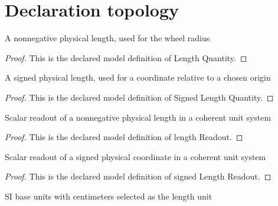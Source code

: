 \section{Declaration topology}
\begin{definition}
  \label{def:physics:phyx-mini-0736:phyxminiproblems-problemphyxmini0736-lengthquantity}
  A nonnegative physical length, used for the wheel radius
\end{definition}
\begin{proof}
  This is the declared model definition of Length Quantity.
\end{proof}
\begin{definition}
  \label{def:physics:phyx-mini-0736:phyxminiproblems-problemphyxmini0736-signedlengthquantity}
  A signed physical length, used for a coordinate relative to a chosen origin
\end{definition}
\begin{proof}
  This is the declared model definition of Signed Length Quantity.
\end{proof}
\begin{definition}
  \label{def:physics:phyx-mini-0736:phyxminiproblems-problemphyxmini0736-lengthreadout}
  Scalar readout of a nonnegative physical length in a coherent unit system
\end{definition}
\begin{proof}
  This is the declared model definition of length Readout.
\end{proof}
\begin{definition}
  \label{def:physics:phyx-mini-0736:phyxminiproblems-problemphyxmini0736-signedlengthreadout}
  Scalar readout of a signed physical coordinate in a coherent unit system
\end{definition}
\begin{proof}
  This is the declared model definition of signed Length Readout.
\end{proof}
\begin{definition}
  \label{def:physics:phyx-mini-0736:phyxminiproblems-problemphyxmini0736-centimeterunitchoices}
  SI base units with centimeters selected as the length unit
\end{definition}
